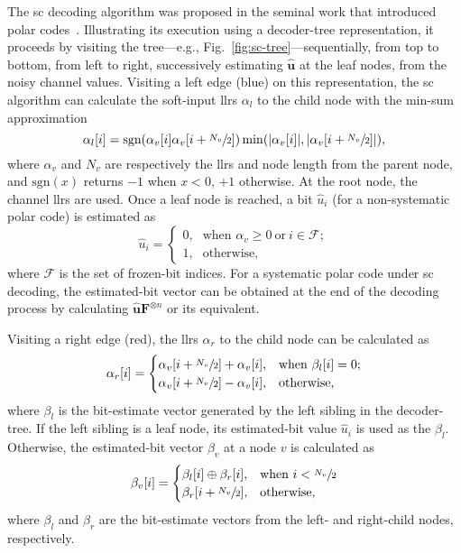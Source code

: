 \documentclass[conference,letterpaper]{IEEEtran}
\newcommand{\sgn}[1]{\text{sgn}(#1)}
\newcommand{\mvec}[1]{\bm{#1}}
\begin{document}
The \gls{sc} decoding algorithm was proposed in the seminal work that introduced polar codes~\cite{ArikanFirst}. Illustrating its execution using a decoder-tree representation, it proceeds by visiting the tree---e.g., Fig.~\ref{fig:sc-tree}---sequentially, from top to bottom, from left to right, successively estimating $\bm{\hat{u}}$ at the leaf nodes, from the noisy channel values. Visiting a left edge (blue) on this representation, the \gls{sc} algorithm can calculate the soft-input \glspl{llr} $\alpha_l$ to the child node with the min-sum approximation \cite{Leroux2011}
\begin{equation}\label{eqn:sc:f}
\alpha_l[i] = \sgn{\alpha_v[i]\alpha_v[i + \sfrac{N_v}{2}]} \min(|\alpha_v[i]|, |\alpha_v[i + \sfrac{N_v}{2}]|),
\end{equation}
where $\alpha_v$ and $N_v$ are respectively the \glspl{llr} and node length from the parent node, and $\sgn{x}$ returns $-1$ when $x<0$, $+1$ otherwise. At the root node, the channel \glspl{llr} are used. Once a leaf node is reached, a bit $\hat{u}_i$ (for a non-systematic polar code) is estimated as
\begin{equation}\label{eqn:sc:estu}
\hat{u}_i = \begin{cases}
0\text{,} & \text{when } \alpha_v \geq 0~\text{or}~i \in \mathcal{F};\\
1\text{,} & \text{otherwise,}
\end{cases}
\end{equation}
where $\mathcal{F}$ is the set of frozen-bit indices. For a systematic polar code under \gls{sc} decoding, the estimated-bit vector can be obtained at the end of the decoding process by calculating $\mvec{\hat{u}}\mvec{F}^{\otimes n}$ or its equivalent.

Visiting a right edge (red), the \glspl{llr} $\alpha_r$ to the child node can be calculated \cite{Leroux2011} as
\begin{equation}\label{eqn:sc:g}
\alpha_r[i] = \begin{cases}
\alpha_v[i + \sfrac{N_v}{2}] + \alpha_v[i]\text{,} & \text{when } \beta_l[i] = 0;\\
\alpha_v[i + \sfrac{N_v}{2}] - \alpha_v[i]\text{,} & \text{otherwise},
\end{cases}
\end{equation}
where $\beta_l$ is the bit-estimate vector generated by the left sibling in the decoder-tree. If the left sibling is a leaf node, its estimated-bit value $\hat{u}_i$ is used as the $\beta_l$. Otherwise, the estimated-bit vector $\beta_v$ at a node $v$ is calculated as
\begin{equation}\label{eqn:sc:combine}
\beta_v[i] =
  \begin{cases}
    \beta_l[i]\oplus \beta_r[i], & \text{when}~i < \sfrac{N_v}{2}\\
    \beta_r[i+\sfrac{N_v}{2}], & \text{otherwise},
  \end{cases}
\end{equation}
where $\beta_l$ and $\beta_r$ are the bit-estimate vectors from the left- and right-child nodes, respectively.
\end{document}
